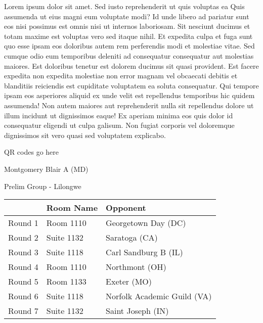 \documentclass{article}%
\begin{document}
\vspace*{8pt}%
\linebreak%
\newline%
\newline%
Lorem ipsum dolor sit amet. Sed iusto reprehenderit ut quis voluptas ea Quis assumenda ut eius magni eum voluptate modi? Id unde libero ad pariatur sunt eos nisi possimus est omnis nisi ut internos laboriosam. Sit nesciunt ducimus et totam maxime est voluptas vero sed itaque nihil. Et expedita culpa et fuga sunt quo esse ipsam eos doloribus autem rem perferendis modi et molestiae vitae.\newline%
\newline%
Sed cumque odio eum temporibus deleniti ad consequatur consequatur aut molestias maiores. Est doloribus tenetur est dolorem ducimus sit quasi provident. Est facere expedita non expedita molestiae non error magnam vel obcaecati debitis et blanditiis reiciendis est cupiditate voluptatem ea soluta consequatur. Qui tempore ipsam eos asperiores aliquid ex unde velit est repellendus temporibus hic quidem assumenda!\newline%
\newline%
Non autem maiores aut reprehenderit nulla sit repellendus dolore ut illum incidunt ut dignissimos eaque! Ex aperiam minima eos quis dolor id consequatur eligendi ut culpa galisum. Non fugiat corporis vel doloremque dignissimos sit vero quasi sed voluptatem explicabo.\newline%
\newline%
%
\vspace*{30pt}%
\begin{center}%
\begin{Huge}%
QR codes go here%
\end{Huge}%
\end{center}%
\newpage%
%
\begin{center}%
\begin{Huge}%
Montgomery Blair A (MD)%
\end{Huge}%
\vspace*{8pt}%
\linebreak%
\begin{Large}%
Prelim Group {-} Lilongwe%
\end{Large}%
\end{center}%
\begin{tabularx}{\textwidth}{|c|Y|Y|}%
\hline%
&Room Name&Opponent\\%
\hline%
Round 1&Room 1110&Georgetown Day (DC)\\%
Round 2&Suite 1132&Saratoga (CA)\\%
Round 3&Suite 1118&Carl Sandburg B (IL)\\%
Round 4&Room 1110&Northmont (OH)\\%
Round 5&Room 1133&Exeter (MO)\\%
Round 6&Suite 1118&Norfolk Academic Guild (VA)\\%
Round 7&Suite 1132&Saint Joseph (IN)\\%
\hline%
\end{tabularx}%
\end{document}
